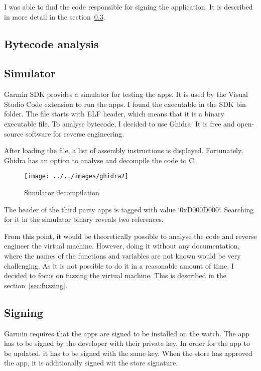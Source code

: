 I was able to find the code responsible for signing the application.
It is described in more detail in the section~\ref{subsec:signing}.

\subsection{Bytecode analysis}

\subsection{Simulator}
Garmin SDK provides a simulator for testing the apps.
It is used by the Visual Studio Code extension to run the apps.
I found the executable in the SDK bin folder.
The file starts with ELF header, which means that it is a binary executable file.
To analyse bytecode, I decided to use Ghidra\cite{ghidra}.
It is free and open-source software for reverse engineering.

After loading the file, a list of assembly instructions is displayed.
Fortunately, Ghidra has an option to analyse and decompile the code to C\@.

\begin{figure}[h]
    \centering
    \texttt{[image: ../../images/ghidra2]}
    \caption{Simulator decompilation}
    \label{fig:concept}
\end{figure}

The header of the third party apps is tagged with value `0xD000D000`\cite{broken-vm}.
Searching for it in the simulator binary reveals two references.

From this point, it would be theoretically possible to analyse the code and reverse engineer the virtual machine.
However, doing it without any documentation, where the names of the functions and variables are not known would be very challenging.
As it is not possible to do it in a reasonable amount of time, I decided to focus on fuzzing the virtual machine.
This is described in the section~\ref{sec:fuzzing}.

\subsection{Signing} \label{subsec:signing}
Garmin requires that the apps are signed to be installed on the watch\cite{garmin-signing}.
The app has to be signed by the developer with their private key.
In order for the app to be updated, it has to be signed with the same key.
When the store has approved the app, it is additionally signed wit the store signature.

